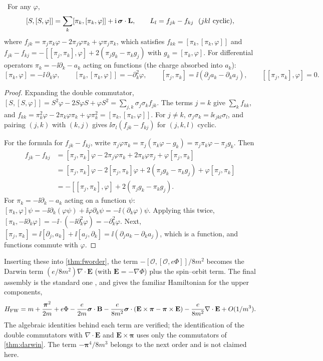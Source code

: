 \begin{theorem}\label{thm:darwin}\ver\
For any $\varphi$,
\[
[S,[S,\varphi]]=\sum_k[\pi_k,[\pi_k,\varphi]]+\mathrm{i}\,\boldsymbol{\sigma}\cdot\mathbf L,\qquad L_l=f_{jk}-f_{kj}\ \ (jkl\text{ cyclic}),
\]
where $f_{jk}=\pi_j\pi_k\varphi-2\pi_j\varphi\pi_k+\varphi\pi_j\pi_k$, which satisfies $f_{kk}=[\pi_k,[\pi_k,\varphi]]$ and $f_{jk}-f_{kj}=-[[\pi_j,\pi_k],\varphi]+2(\pi_jg_k-\pi_kg_j)$ with $g_k=[\pi_k,\varphi]$. For differential operators $\pi_k=-\ii\partial_k-a_k$ acting on functions (the charge absorbed into $a_k$):
\[
[\pi_k,\varphi]=-\ii\,\partial_k\varphi,\qquad [\pi_k,[\pi_k,\varphi]]=-\partial_k^2\varphi,\qquad [\pi_j,\pi_k]=\ii(\partial_ja_k-\partial_ka_j),\qquad [[\pi_j,\pi_k],\varphi]=0 .
\]
\end{theorem}
\begin{proof}
Expanding the double commutator, $[S,[S,\varphi]]=S^2\varphi-2S\varphi S+\varphi S^2=\sum_{j,k}\sigma_j\sigma_kf_{jk}$. The terms $j=k$ give $\sum_kf_{kk}$, and $f_{kk}=\pi_k^2\varphi-2\pi_k\varphi\pi_k+\varphi\pi_k^2=[\pi_k,[\pi_k,\varphi]]$. For $j\ne k$, $\sigma_j\sigma_k=\ii\epsilon_{jkl}\sigma_l$, and pairing $(j,k)$ with $(k,j)$ gives $\ii\sigma_l(f_{jk}-f_{kj})$ for $(j,k,l)$ cyclic.

For the formula for $f_{jk}-f_{kj}$, write $\pi_j\varphi\pi_k=\pi_j(\pi_k\varphi-g_k)=\pi_j\pi_k\varphi-\pi_jg_k$. Then
\begin{align*}
f_{jk}-f_{kj}&=[\pi_j,\pi_k]\varphi-2\pi_j\varphi\pi_k+2\pi_k\varphi\pi_j+\varphi[\pi_j,\pi_k]\\
&=[\pi_j,\pi_k]\varphi-2[\pi_j,\pi_k]\varphi+2(\pi_jg_k-\pi_kg_j)+\varphi[\pi_j,\pi_k]\\
&=-[[\pi_j,\pi_k],\varphi]+2(\pi_jg_k-\pi_kg_j).
\end{align*}
For $\pi_k=-\ii\partial_k-a_k$ acting on a function $\psi$: $[\pi_k,\varphi]\psi=-\ii\partial_k(\varphi\psi)+\ii\varphi\partial_k\psi=-\ii(\partial_k\varphi)\psi$. Applying this twice, $[\pi_k,-\ii\partial_k\varphi]=-\ii\cdot(-\ii\partial_k^2\varphi)=-\partial_k^2\varphi$. Next, $[\pi_j,\pi_k]=\ii[\partial_j,a_k]+\ii[a_j,\partial_k]=\ii(\partial_ja_k-\partial_ka_j)$, which is a function, and functions commute with $\varphi$.
\end{proof}


Inserting these into \cref{thm:fworder}, the term $-[\mathcal O,[\mathcal O,e\Phi]]/8m^2$ becomes the Darwin term $(e/8m^2)\nabla\cdot\mathbf E$ (with $\mathbf E=-\nabla\Phi$) plus the spin--orbit term. The final assembly is the standard one \cite{BjorkenDrell}, and gives the familiar Hamiltonian for the upper components,
\[
H_{\mathrm{FW}}=m+\frac{\bm\pi^2}{2m}+e\Phi-\frac{e}{2m}\boldsymbol{\sigma}\cdot\mathbf B-\frac{e}{8m^2}\boldsymbol{\sigma}\cdot(\mathbf E\times\bm\pi-\bm\pi\times\mathbf E)-\frac{e}{8m^2}\nabla\cdot\mathbf E+O(1/m^3).
\]
The algebraic identities behind each term are verified; the identification of the double commutators with $\nabla\cdot\mathbf E$ and $\mathbf E\times\bm\pi$ uses only the commutators of \cref{thm:darwin}. The term $-\bm\pi^4/8m^3$ belongs to the next order and is not claimed here.

